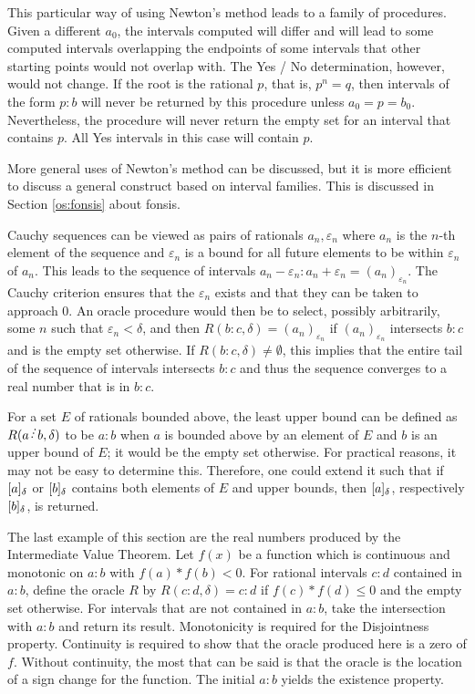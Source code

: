 \documentclass[12pt]{article}
\begin{document}
This particular way of using Newton's method leads to a family of procedures. Given a different $a_0$, the intervals computed will differ and will lead to some computed intervals overlapping the endpoints of some intervals that other starting points would not overlap with. The Yes / No determination, however, would not  change. If the root is the rational $p$, that is, $p^n = q$,  then intervals of the form $p:b$ will never be returned by this procedure unless $a_0 = p = b_0$. Nevertheless, the procedure will never return the empty set for an interval that contains $p$. All Yes intervals in this case will contain $p$. 

More general uses of Newton's method can be discussed, but it is more efficient to discuss a general construct based on interval families. This is discussed in Section \ref{os:fonsis} about fonsis. 

Cauchy sequences can be viewed as pairs of rationals $a_n, \varepsilon_n$ where $a_n$ is the $n$-th element of the sequence and $\varepsilon_n$ is a bound for all future elements to be within $\varepsilon_n$ of $a_n$. This leads to the sequence of intervals $a_n-\varepsilon_n:a_n+\varepsilon_n = (a_n)_{\varepsilon_n}$. The Cauchy criterion ensures that the $\varepsilon_n$ exists and that they can be taken to approach 0. An oracle procedure would then be to select, possibly arbitrarily, some $n$ such that $\varepsilon_n < \delta$, and then  $R(b:c, \delta) = (a_n)_{\varepsilon_n}$ if $(a_n)_{\varepsilon_n}$ intersects $b:c$ and is the empty set otherwise. If $R(b:c, \delta) \neq \emptyset$, this implies that the entire tail of the sequence of intervals intersects $b:c$ and thus the sequence converges to a real number that is in $b:c$.  

For a set $E$ of rationals bounded above, the least upper bound can be defined as $R(a \lte b, \delta)$ to be $a:b$ when $a$ is bounded above by an element of $E$ and $b$ is an upper bound of $E$; it would be the empty set otherwise. For practical reasons, it may not be easy to determine this. Therefore, one could extend it such that if $[a]_{\delta}$ or $[b]_{\delta}$ contains both elements of $E$ and upper bounds, then $[a]_{\delta}$, respectively $[b]_{\delta}$, is returned. 

The last example of this section are the real numbers produced by the Intermediate Value Theorem. Let $f(x)$ be a function which is continuous and monotonic on $a:b$ with $f(a)*f(b) < 0$. For rational intervals $c:d$ contained in $a:b$, define the oracle $R$ by $R(c:d, \delta) = c:d$ if $f(c)*f(d) \leq 0$ and the empty set otherwise. For intervals that are not contained in $a:b$, take the intersection with $a:b$ and return its result. Monotonicity is required for the Disjointness property. Continuity is required to show that the oracle produced here is a zero of $f$. Without continuity, the most that can be said is that the oracle is the location of a sign change for the function. The initial $a:b$ yields the existence property. 
\end{document}
